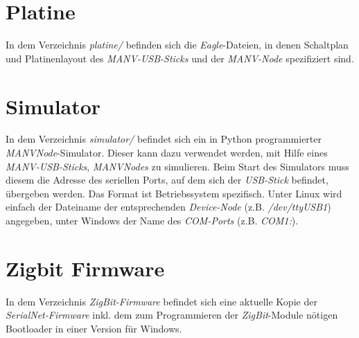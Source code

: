     \section{Platine}

    In dem Verzeichnis \emph{platine/} befinden sich die \emph{Eagle}-Dateien, in 
    denen Schaltplan und Platinenlayout des \emph{MANV-USB-Sticks} und der
    \emph{MANV-Node} spezifiziert sind.

    \section{Simulator}

    In dem Verzeichnis \emph{simulator/} befindet sich ein in Python programmierter
    \emph{MANVNode}-Simulator. Dieser kann dazu verwendet werden, mit Hilfe
    eines \emph{MANV-USB-Sticks}, \emph{MANVNodes} zu simulieren. Beim Start des
    Simulators muss diesem die Adresse des seriellen Ports, auf dem sich der
    \emph{USB-Stick} befindet, übergeben werden. Das Format ist Betriebssystem spezifisch. Unter
    Linux wird einfach der Dateiname der entsprechenden \emph{Device-Node} (z.B. \emph{/dev/ttyUSB1}) 
    angegeben, unter Windows der Name des \emph{COM-Ports} (z.B. \emph{COM1:}).

    \section{Zigbit Firmware}
    In dem Verzeichnis \emph{ZigBit-Firmware} befindet sich eine aktuelle Kopie der
    \emph{SerialNet-Firmware} inkl. dem zum Programmieren der \emph{ZigBit}-Module
    nötigen Bootloader in einer Version für Windows.
